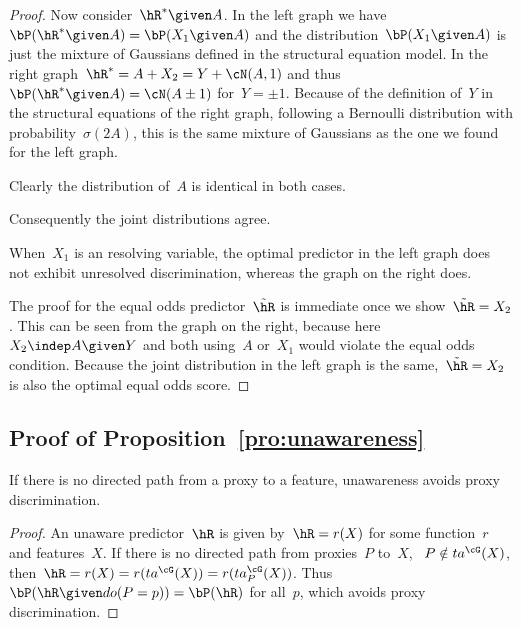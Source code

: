 \begin{proof}
  Now consider~$\hR^* \given A$. In the left graph we have~$\bP(\hR^* \given A)
  = \bP(X_1 \given A)$ and the distribution~$\bP(X_1 \given A)$ is just the
  mixture of Gaussians defined in the structural equation model. In the right
  graph~$\hR^* = A + X_2 = Y + \cN(A,1)$ and thus~$\bP(\hR^* \given A) = \cN(A
  \pm 1)$ for~$Y = \pm 1$. Because of the definition of~$Y$ in the structural
  equations of the right graph, following a Bernoulli distribution with
  probability~$\sigma(2 A)$, this is the same mixture of Gaussians as the one we
  found for the left graph.

  Clearly the distribution of~$A$ is identical in both cases.

  Consequently the joint distributions agree.

  When~$X_1$ is an resolving variable, the optimal predictor in the left
  graph does not exhibit unresolved discrimination, whereas the graph on the
  right does.

  The proof for the equal odds predictor~$\tilde{\hR}$ is immediate once we
  show~$\tilde{\hR} = X_2$. This can be seen from the graph on the right,
  because here~$X_2 \indep A \given Y$ and both using~$A$ or~$X_1$ would
  violate the equal odds condition. Because the joint distribution in the left
  graph is the same,~$\tilde{\hR} = X_2$ is also the optimal equal odds
  score.\qedhere
\end{proof}

\subsection*{Proof of Proposition~\ref{pro:unawareness}}

\begin{proposition*}
  If there is no directed path from a proxy to a feature, unawareness avoids
  proxy discrimination.
\end{proposition*}

\begin{proof}
  An unaware predictor~${\hR}$ is given by~${\hR} = r (X)$ for some function~$r$
  and features~$X$. If there is no directed path from proxies~$P$ to~$X$,
  \ie{}~$P \notin ta^{\cG}(X)$, then~${\hR} = r(X) = r(ta^{\cG}(X)) =
  r(ta^{\cG}_P(X))$.  Thus~$\bP({\hR} \given do(P=p)) = \bP({\hR})$ for all~$p$,
  which avoids proxy discrimination.\qedhere
\end{proof}

